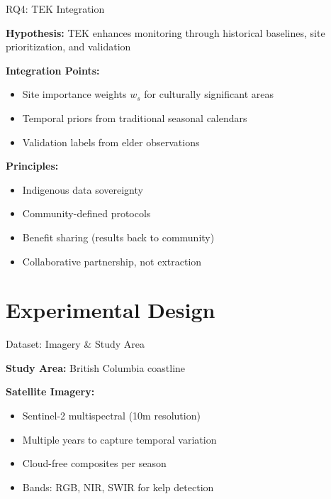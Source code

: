 \documentclass[10pt,xcolor={table,dvipsnames},t]{beamer}
\begin{document}
\begin{frame}{RQ4: TEK Integration}

\textbf{Hypothesis:} TEK enhances monitoring through historical baselines, site prioritization, and validation

\vspace{0.5em}
\textbf{Integration Points:}
\begin{itemize}
  \item Site importance weights $w_s$ for culturally significant areas
  \item Temporal priors from traditional seasonal calendars
  \item Validation labels from elder observations
\end{itemize}

\vspace{0.5em}
\textbf{Principles:}
\begin{itemize}
  \item Indigenous data sovereignty
  \item Community-defined protocols
  \item Benefit sharing (results back to community)
  \item Collaborative partnership, not extraction
\end{itemize}

\end{frame}

\section{Experimental Design}

\begin{frame}{Dataset: Imagery \& Study Area}

\textbf{Study Area:} British Columbia coastline

\vspace{0.5em}
\textbf{Satellite Imagery:}
\begin{itemize}
  \item Sentinel-2 multispectral (10m resolution)
  \item Multiple years to capture temporal variation
  \item Cloud-free composites per season
  \item Bands: RGB, NIR, SWIR for kelp detection
\end{itemize}

\end{frame}
\end{document}
